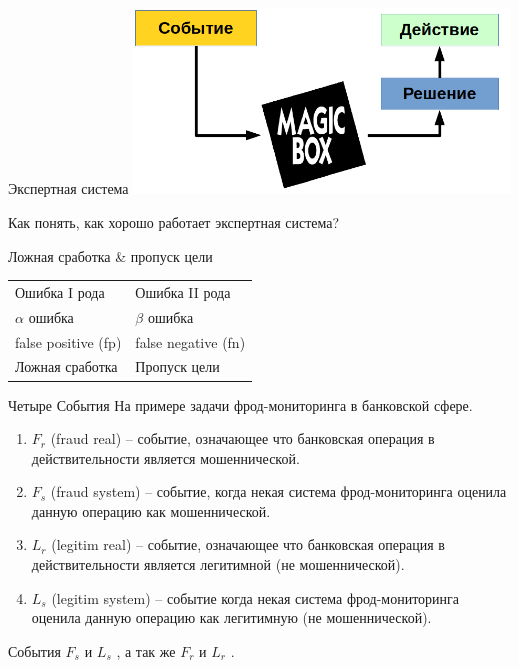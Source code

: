    \begin{frame}{Экспертная система}
       \includegraphics[width=10cm]{../pic/expert_system_1.png}
       
       Как понять, как хорошо работает экспертная система?
   \end{frame}
  
  \begin{frame}{Ложная сработка \& пропуск цели} 
  \centering
  \LARGE
  \begin{tabular}{l|l}
  	Ошибка I рода & Ошибка II рода \\
  	$\alpha$ ошибка & $\beta$ ошибка \\
  	false positive (fp) & false negative (fn) \\ 
  	Ложная сработка  & Пропуск цели \\
  \end{tabular}
  \end{frame}

  \begin{frame}{Четыре События}
  \small На примере задачи фрод-мониторинга в банковской сфере.
  \begin{enumerate}
  	\item $F_r$ (fraud real) -- событие, означающее что банковская операция в действительности является мошеннической. 
  	\item $F_s$ (fraud system) -- событие, когда некая система фрод-мониторинга оценила данную операцию как мошеннической.
  	\item $L_r$ (legitim real) -- событие, означающее что банковская операция в действительности является легитимной (не мошеннической).
  	\item $L_s$ (legitim system) -- событие когда некая система фрод-мониторинга оценила данную операцию как легитимную (не мошеннической).
  \end{enumerate}
  События $F_s$ и $L_s$ , 
  а так же $F_r$ и $L_r$ .
  \end{frame}


